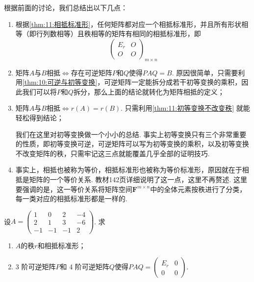 根据前面的讨论，我们总结出以下几点：
\begin{enumerate}
    \item 根据\autoref{thm:11:相抵标准形}，任何矩阵都对应一个相抵标准形，并且所有形状相等（即行列数相等）且秩相等的矩阵有相同的相抵标准形，即\[\begin{pmatrix}
                  E_r & O \\ O & O
              \end{pmatrix}_{m\times n}\]

    \item 矩阵$A$与$B$相抵$\iff$存在可逆矩阵$P$和$Q$使得$PAQ=B$. 原因很简单，只需要利用\autoref{thm:10:可逆与初等变换}，可逆矩阵一定能拆分成若干初等变换的乘积，因此我们可以将$P$和$Q$拆分，那么上面的结论就转化为矩阵相抵的定义；

    \item 矩阵$A$与$B$相抵$\iff r(A)=r(B)$. 只需利用\autoref{thm:11:初等变换不改变秩} 就能轻松得到结论；

          我们在这里对初等变换做一个小小的总结. 事实上初等变换只有三个非常重要的性质，即初等变换可逆，可逆矩阵可以写为初等变换的乘积，以及初等变换不改变矩阵的秩，只需牢记这三点就能覆盖几乎全部的证明技巧.

    \item 事实上，相抵也被称为等价，相抵标准形也被称为等价标准形，原因就在于相抵是矩阵的一个等价关系. 教材142页详细说明了这一点，这里不再赘述. 这里要强调的是，这一等价关系将矩阵空间$\mathbf{F}^{m\times n}$中的全体元素按秩进行了分类，每一类对应的相抵标准形都是一样的.
\end{enumerate}

\begin{example}
    设$A=\begin{pmatrix}
            1 & 0 & 2 & -4 \\ 2 & 1 & 3 & -6 \\ -1 & -1 & -1 & 2
        \end{pmatrix}$. 求
    \begin{enumerate}[label=(\arabic*)]
        \item $A$的秩$r$和相抵标准形；

        \item
              3 阶可逆矩阵$P$和 4 阶可逆矩阵$Q$使得$PAQ=\begin{pmatrix}
                      E_r & 0 \\ 0 & 0
                  \end{pmatrix}$.
    \end{enumerate}
\end{example}

